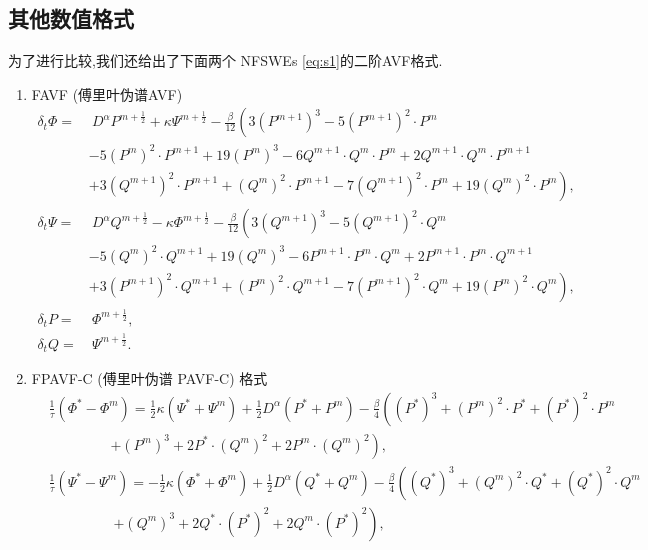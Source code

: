 \subsection{其他数值格式}
为了进行比较,我们还给出了下面两个 NFSWEs \eqref{eq:s1}的二阶AVF格式.
\begin{enumerate}[$\bullet$]
\item FAVF (傅里叶伪谱AVF) 
\begin{align}
\delta_{t} \varPhi =&~D^{\alpha} P^{m+\frac{1}{2}}+\kappa \Psi^{m+\frac{1}{2}}-\frac{\beta}{12}\left(3 (P^{m+1})^3-5 (P^{m+1})^2\cdot P^{m}\right.\nonumber\\
		&-5 (P^{m})^2\cdot P^{m+1}+19 (P^{m})^3-6 Q^{m+1}\cdot Q^{m}\cdot P^{m}+2 Q^{m+1}\cdot Q^{m}\cdot P^{m+1} \nonumber\\
		&+\left. 3 (Q^{m+1})^2\cdot P^{m+1}+(Q^{m})^2\cdot P^{m+1}-7 (Q^{m+1})^2\cdot P^{m}+19 (Q^{m} )^2\cdot P^{m}\right),\label{eq_66}\\
\delta_{t} \Psi =&~D^{\alpha} Q^{m+\frac{1}{2}}-\kappa \varPhi^{m+\frac{1}{2}}-\frac{\beta}{12}\left(3 (Q^{m+1})^3-5 (Q^{m+1})^2\cdot Q^{m}\right.\nonumber\\
		&-5 (Q^{m})^2\cdot Q^{m+1}+19 (Q^{m})^3-6 P^{m+1}\cdot P^{m}\cdot Q^{m}+2 P^{m+1}\cdot P^{m}\cdot Q^{m+1} \nonumber\\
		&+\left. 3 (P^{m+1})^2\cdot Q^{m+1}+(P^{m})^2\cdot Q^{m+1}-7 (P^{m+1})^2\cdot Q^{m}+19 (P^{m} )^2\cdot Q^{m}\right),\label{eq_67}\\
\delta_{t} P=&~\varPhi^{m+\frac{1}{2}},\label{eq_68}\\
\delta_{t} Q=&~\Psi^{m+\frac{1}{2}}.\label{eq_69}
\end{align}
\item FPAVF-C (傅里叶伪谱 PAVF-C) 格式
\begin{align}
&\frac{1}{\tau}\left(\varPhi^{*}-\varPhi^{m}\right)=\frac{1}{2}\kappa(\Psi^{*}+\Psi^{m})+\frac{1}{2}D^{\alpha} (P^{*}+P^{m})-\frac{\beta}{4}\left( (P^{*})^3+ (P^{m})^{2}\cdot P^{*}+(P^{*})^{2}\cdot P^{m}\right.\nonumber\\
		&~~~~~~~~~~~~~~~~~~~~\left.+ (P^{m})^{3}+2 P^{*}\cdot (Q^{m})^{2}+2 P^{m}\cdot (Q^{m})^{2}\right),\label{eq_90}\\
&\frac{1}{\tau}\left(\Psi^{*}-\Psi^{m}\right)=-\frac{1}{2}\kappa (\varPhi^{*}+\varPhi^{m})+\frac{1}{2}D^{\alpha} (Q^{*}+Q^{m})-\frac{\beta}{4}\left( (Q^{*})^3+ (Q^{m})^{2}\cdot Q^{*}+ (Q^{*})^{2}\cdot Q^{m}\right.\nonumber\\
		&~~~~~~~~~~~~~~~~~~~~~\left.+ (Q^{m})^{3}+2 Q^{*}\cdot (P^{*})^{2}+2 Q^{m}\cdot (P^{*})^{2}\right),\label{eq_91}\\

\end{align}
\end{enumerate}
